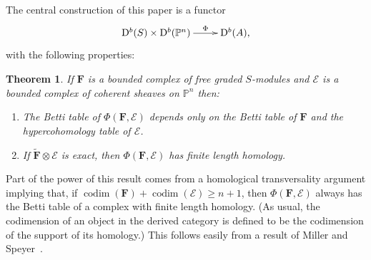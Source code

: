 \documentclass[12pt]{amsart}
\newtheorem{theorem}[lemma]{Theorem}
\theoremstyle{definition}
\theoremstyle{remark}
\newcommand{\codim}{\operatorname{codim}}
\newcommand{\PP}{\mathbb{P}}
\newcommand{\cE}{\mathcal{E}}
\newcommand{\FF}{\mathbf{F}}
\newcommand{\DD}{\mathrm{D}}
\renewcommand{\P}{{\mathbb P}}
\begin{document}
The central construction of this paper is a functor
$$
\xymatrix{\DD^{b}(S)\times \DD^{b}(\PP^{n})  \ar[r]^-{\Phi}&\DD^{b}(A),}
$$
with the following properties:
\begin{theorem}\label{thm:Phi} If $\FF$ is a bounded complex of free graded $S$-modules and $\cE$ is a bounded complex of coherent sheaves on $\P^{n}$ then:
\begin{enumerate}
	\item\label{thm:Phi:1}  The Betti table of $\Phi(\FF,\cE)$ depends only on the Betti table of $\FF$ and the hypercohomology table of $\cE$.
	\item\label{thm:Phi:2}  If $\widetilde{\FF}\otimes \cE$ is exact, then $\Phi(\FF,\cE)$ has finite length homology.  
\end{enumerate}
\end{theorem}

Part of the power of this result comes from a homological transversality argument implying that, if
$\codim(\FF)+\codim(\cE)\geq n+1$, then $\Phi(\FF,\cE)$ always has the Betti table of a complex with finite length homology. (As usual, the codimension of an object in the derived category is defined to be the codimension of the support of its homology.) This follows easily from a result of Miller and Speyer~\cite[Theorem, p.\ 335]{miller-speyer}.
\end{document}

